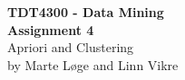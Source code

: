 
\begin{titlepage}
	\begin{center}

	
		{\Huge \bf TDT4300 - Data Mining} \\[2.0cm]
		{\Huge \bf Assignment 4} \\[6.0cm]


		{\Huge Apriori and Clustering} \\[8.0cm]


		{\Large by Marte Løge and Linn Vikre} \\[1.0cm]


	\end{center}
\end{titlepage}